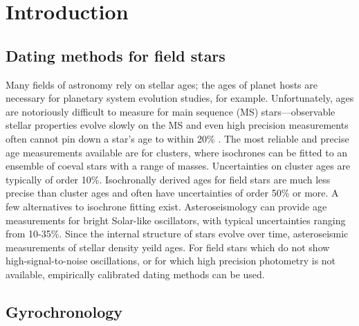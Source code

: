 \documentclass[10pt,preprint]{aastex}
\begin{document}
\section{Introduction}
\label{intro}
\subsection{Dating methods for field stars}

Many fields of astronomy rely on stellar ages; the ages of planet hosts are necessary for planetary system evolution studies, for example.
Unfortunately, ages are notoriously difficult to measure for main sequence (MS) stars---observable stellar properties evolve slowly on the MS and even high precision measurements often cannot pin down a star's age to within 20\% \citep{Soderblom2010}.
The most reliable and precise age measurements available are for clusters, where isochrones can be fitted to an ensemble of coeval stars with a range of masses.
Uncertainties on cluster ages are typically of order 10\%.
Isochronally derived ages for field stars are much less precise than cluster ages and often have uncertainties of order 50\% or more.
A few alternatives to isochrone fitting exist.
Asteroseismology can provide age measurements for bright Solar-like oscillators, with typical uncertainties ranging from 10-35\%.
Since the internal structure of stars evolve over time, asteroseismic measurements of stellar density yeild ages.
For field stars which do not show high-signal-to-noise oscillations, or for which high precision photometry is not available, empirically calibrated dating methods can be used.


\subsection{Gyrochronology}
\end{document}
